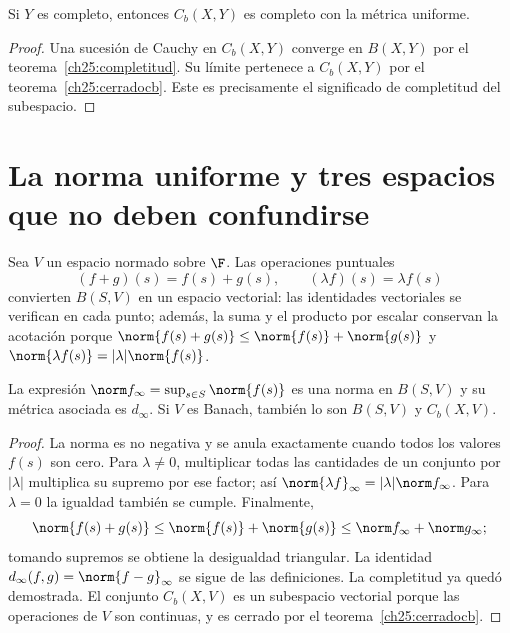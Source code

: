 \begin{corolario}
Si $Y$ es completo, entonces $C_b(X,Y)$ es completo con la métrica uniforme.
\end{corolario}
\begin{proof}
Una sucesión de Cauchy en $C_b(X,Y)$ converge en $B(X,Y)$ por el teorema~\ref{ch25:completitud}. Su límite pertenece a $C_b(X,Y)$ por el teorema~\ref{ch25:cerradocb}. Este es precisamente el significado de completitud del subespacio.
\end{proof}

\section{La norma uniforme y tres espacios que no deben confundirse}
Sea $V$ un espacio normado sobre $\F$. Las operaciones puntuales
\[
 (f+g)(s)=f(s)+g(s),\qquad (\lambda f)(s)=\lambda f(s)
\]
convierten $B(S,V)$ en un espacio vectorial: las identidades vectoriales se verifican en cada punto; además, la suma y el producto por escalar conservan la acotación porque
$\norm{f(s)+g(s)}\le\norm{f(s)}+\norm{g(s)}$ y $\norm{\lambda f(s)}=|\lambda|\norm{f(s)}$.

\begin{proposicion}
La expresión $\norm f_\infty=\sup_{s\in S}\norm{f(s)}$ es una norma en $B(S,V)$ y su métrica asociada es $d_\infty$. Si $V$ es Banach, también lo son $B(S,V)$ y $C_b(X,V)$.
\end{proposicion}
\begin{proof}
La norma es no negativa y se anula exactamente cuando todos los valores $f(s)$ son cero. Para $\lambda\ne0$, multiplicar todas las cantidades de un conjunto por $|\lambda|$ multiplica su supremo por ese factor; así $\norm{\lambda f}_\infty=|\lambda|\norm f_\infty$. Para $\lambda=0$ la igualdad también se cumple. Finalmente,
\[
 \norm{f(s)+g(s)}\le\norm{f(s)}+\norm{g(s)}\le\norm f_\infty+\norm g_\infty;
\]
tomando supremos se obtiene la desigualdad triangular. La identidad $d_\infty(f,g)=\norm{f-g}_\infty$ se sigue de las definiciones. La completitud ya quedó demostrada. El conjunto $C_b(X,V)$ es un subespacio vectorial porque las operaciones de $V$ son continuas, y es cerrado por el teorema~\ref{ch25:cerradocb}.
\end{proof}

